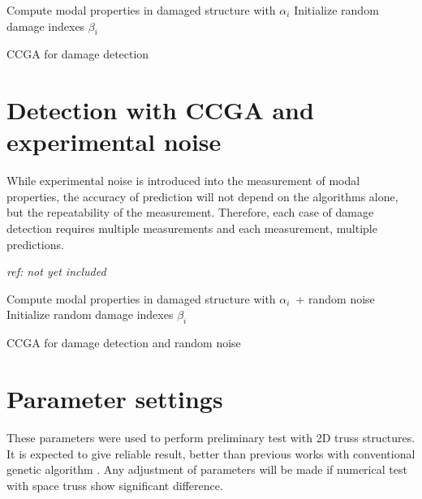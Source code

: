 \bigskip
\begin{algorithm}[H]
 \SetAlgoLined
 Compute modal properties in damaged structure with $\alpha_i$\;
 Initialize random damage indexes $\beta_i$\;
 \caption{CCGA for damage detection}
\end{algorithm}
\section{Detection with CCGA and experimental noise}

While experimental noise is introduced into the measurement of modal properties, the accuracy of prediction will not depend on the algorithms alone, but the repeatability of the measurement. Therefore, each case of damage detection requires multiple measurements and each measurement, multiple predictions. 

\emph{ref: not yet included}


\bigskip
\begin{algorithm}[H]
 \SetAlgoLined
 Compute modal properties in damaged structure with $\alpha_i$\ + random noise\;
 Initialize random damage indexes $\beta_i$\;
 \caption{CCGA for damage detection and random noise}
\end{algorithm}


\section{Parameter settings}
These parameters were used to perform preliminary test with 2D truss structures. It is expected to give reliable result, better than previous works with conventional genetic algorithm \cite{rao2004}. Any adjustment of parameters will be made if numerical test with space truss show significant difference.

